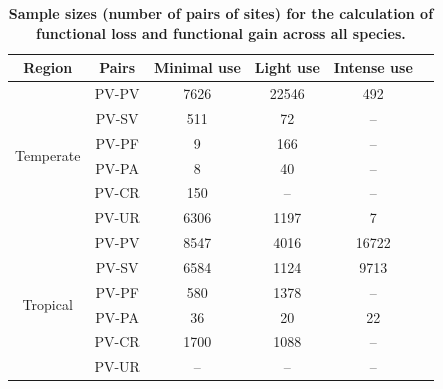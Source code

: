 \vspace{1cm}
\begin{table}[h!]
\renewcommand{\baselinestretch}{1}
\renewcommand{\arraystretch}{1.2}
\begin{center}\fontsize{9}{11}\selectfont
\caption[Sample sizes (number of pairs of sites) for the calculation of functional loss and functional gain across all species]{\textbf{Sample sizes (number of pairs of sites) for the calculation of functional loss and functional gain across all species.}} 
\label{}  
\begin{tabular}{@{\extracolsep{5pt}} cccccc} 
\\[-1.8ex]\hline 
\textbf{Region}            & \textbf{Pairs} & \textbf{Minimal use} & \textbf{Light use} & \textbf{Intense use} \\ \hline
\multirow{6}{*}{Temperate} & PV-PV          & 7626                 & 22546              & 492                  \\
                           & PV-SV          & 511                  & 72                 & --                   \\
                           & PV-PF          & 9                    & 166                & --                   \\
                           & PV-PA          & 8                    & 40                 & --                   \\
                           & PV-CR          & 150                  & --                 & --                   \\
                           & PV-UR          & 6306                 & 1197               & 7                    \\ \hline
\multirow{6}{*}{Tropical}  & PV-PV          & 8547                 & 4016               & 16722                \\
                           & PV-SV          & 6584                 & 1124               & 9713                 \\
                           & PV-PF          & 580                  & 1378               & --                   \\
                           & PV-PA          & 36                   & 20                 & 22                   \\
                           & PV-CR          & 1700                 & 1088               & --                   \\
                           & PV-UR          & --                   & --                 & --                   \\ \hline
\end{tabular}
\end{center}
\end{table}

